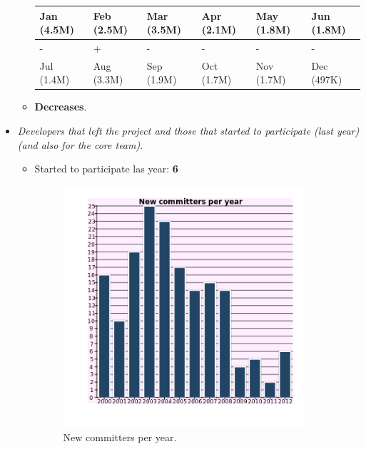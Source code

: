 \documentclass[11pt]{scrartcl}
\begin{document}
\begin{itemize}
\begin{itemize}
            \begin{tabular}{|l|l|l|l|l|l|}
                \hline
        	    Jan (4.5M) & Feb (2.5M) & Mar (3.5M) & Apr (2.1M) & May (1.8M) & Jun (1.8M)\\
        	    \hline
        	    - & + & - & - & - & -\\
                \hline
                Jul (1.4M) & Aug (3.3M) & Sep (1.9M) & Oct (1.7M) & Nov (1.7M) & Dec (497K)\\
                \hline
            \end{tabular}
        \item \textbf{Decreases}.
    \end{itemize}
    \item \emph{Developers that left the project and those that started to participate (last year) (and also for the core team)}.
    \begin{itemize}
        \item Started to participate las year: \textbf{6}

            \begin{figure}[H]
            \begin{center}
              \includegraphics[width=0.9\textwidth]{libcsvanaly2/graphs/graphs.complete.svn/new-committers-year.png}
              \caption{New committers per year.}
              \label{fig:2012-new-commmitters}
            \end{center}
            \end{figure}


\end{itemize}
\end{itemize}
\end{document}
